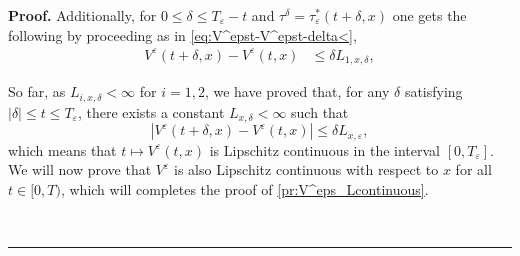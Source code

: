 \documentclass{tufte-handout}
\newenvironment{pf}[1][Proof]{\textbf{#1.} }{\ \rule{0.5em}{0.5em}}
\begin{document}
\begin{pf}
		Additionally, for $0 \leq \delta \leq T_\varepsilon - t $ and $\tau^\delta = \tau_\varepsilon^*(t + \delta, x)$ one gets the following by proceeding as in \eqref{eq:V^epst-V^epst-delta<},
		\begin{align*}
		V^\varepsilon(t + \delta, x) - V^\varepsilon(t, x) &\leq  \delta L_{1, x, \delta},
		\end{align*}
				
		So far, as  $L_{i, x, \delta} < \infty$ for $i =1, 2$, we have proved that, for any $\delta$ satisfying $|\delta| \leq t \leq T_\varepsilon$, there exists a constant $L_{x,\delta} < \infty$ such that
		$$
		|V^\varepsilon(t + \delta, x) - V^\varepsilon(t, x)| \leq \delta L_{x, \varepsilon},
		$$
		which means that $t\mapsto V^\varepsilon(t, x)$ is Lipschitz continuous in the interval $[0, T_\varepsilon]$. We will now prove that $V^\varepsilon$ is also Lipschitz continuous with respect to $x$ for all $t\in [0, T)$, which will completes the proof of \ref{pr:V^eps_Lcontinuous}.
		

\end{pf}
\end{document}
